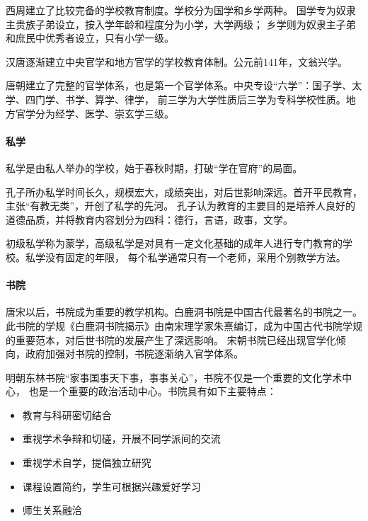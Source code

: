 \documentclass[b5paper,11pt]{article}
\begin{document}
\textcolor{ctp-red}{西周}建立了\textcolor{ctp-red}{比较完备}的学校教育制度。学校分为\textcolor{ctp-red}{国学和乡学}两种。
国学专为\textcolor{ctp-red}{奴隶主贵族子弟}设立，按入学年龄和程度分为\textcolor{ctp-red}{小学，大学}两级；
乡学则为\textcolor{ctp-red}{奴隶主子弟和庶民中优秀者}设立，只有\textcolor{ctp-red}{小学}一级。

\textcolor{ctp-red}{汉唐}逐渐建立\textcolor{ctp-red}{中央官学和地方官学}的学校教育体制。公元前141年，\textcolor{ctp-red}{文翁兴学}。

\textcolor{ctp-red}{唐朝}建立了\textcolor{ctp-red}{完整的官学体系}，也是第一个官学体系。中央专设“六学”：国子学、太学、四门学、书学、算学、律学，
前三学为\textcolor{ctp-red}{大学性质}后三学为\textcolor{ctp-red}{专科学校性质}。地方官学分为\textcolor{ctp-red}{经学、医学、崇玄学}三级。

\paragraph{私学}
私学是由\textcolor{ctp-red}{私人举办}的学校，始于春秋时期，打破\textcolor{ctp-red}{“学在官府”}的局面。

\textcolor{ctp-red}{孔子}所办私学\textcolor{ctp-red}{时间长久，规模宏大，成绩突出，对后世影响深远}。首开平民教育，主张“有教无类”，开创了私学的先河。
孔子认为教育的主要目的是培养人良好的道德品质，并将教育内容划分为四科：\textcolor{ctp-red}{德行，言语，政事，文学}。

\textcolor{ctp-red}{初级私学称为蒙学}，高级私学是对具有一定文化基础的成年人进行专门教育的学校。私学\textcolor{ctp-red}{没有固定的年限}，
每个私学通常只有一个老师，采用\textcolor{ctp-red}{个别教学方法}。

\paragraph{书院}
唐宋以后，书院成为重要的教学机构。\textcolor{ctp-red}{白鹿洞书院}是中国古代最著名的书院之一。
此书院的学规\textcolor{ctp-red}{《白鹿洞书院揭示》}由南宋理学家\textcolor{ctp-red}{朱熹}编订，成为中国古代书院学规的重要范本，对后世书院的发展产生了深远影响。
宋朝书院已经出现官学化倾向，政府加强对书院的控制，书院逐渐纳入官学体系。

明朝\textcolor{ctp-red}{东林书院}“家事国事天下事，事事关心”，书院不仅是一个重要的\textcolor{ctp-red}{文化学术中心}，
也是一个重要的\textcolor{ctp-red}{政治活动中心}。书院具有如下主要特点：
\begin{itemize}
  \item 教育与科研密切结合
  \item 重视学术争辩和切磋，开展不同学派间的交流
  \item 重视学术自学，提倡独立研究
  \item 课程设置简约，学生可根据兴趣爱好学习
  \item 师生关系融洽
\end{itemize}
\end{document}
